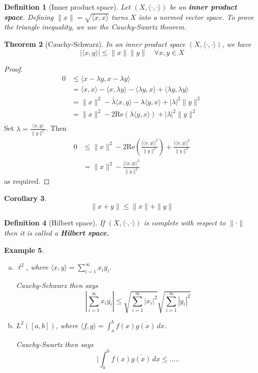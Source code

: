 \documentclass[12pt, oneside, a4paper]{article}
\newtheorem{thm}{Theorem}[section]
\newtheorem{cor}[thm]{Corollary}
\theoremstyle{dfn}
\newtheorem{dfn}[thm]{Definition}
\newtheorem{ex}[thm]{Example}
\renewcommand{\Re}{\text{Re}}
\begin{document}
\begin{dfn}[Inner product space]
    Let $(X, \langle \cdot, \cdot \rangle)$ be an \textbf{inner product space}.  Defining $\| x \| = \sqrt{ \langle x, x \rangle}$ turns $X$ into a normed vector space.  To prove the triangle inequality, we use the Cauchy-Swartz theorem.
\end{dfn}

\begin{thm}[Cauchy-Schwarz]
    In an inner product space $(X, \langle \cdot, \cdot \rangle)$, we have \[
        | \langle x, y \rangle | \leq \|x \| \| y \| \quad \forall x, y  \in X
    \] 
\end{thm}
\begin{proof}
    \begin{align*}
        0   &\leq \langle x - \lambda y, x - \lambda y \rangle \\
            &= \langle x, x \rangle - \langle x, \lambda y \rangle - \langle \lambda y, x \rangle +\langle \lambda y, \lambda y \rangle  \\
            &= \| x \|^2 - \bar \lambda \langle x, y \rangle - \lambda \langle y, x \rangle + |\lambda|^2 \| y \|^2 \\
            &= \| x \|^2 - 2 \Re ( \lambda \langle y, x \rangle ) + |\lambda|^2 \| y \|^2 \\
    \end{align*}  Set $\lambda = \frac{\langle x, y \rangle}{\| y \|^2}$.  Then
    \begin{align*}
        0 &\leq \| x \|^2 - 2 \Re ( \frac{|\langle x, y \rangle|^2}{\| y \|^2} ) + \frac{|\langle x, y \rangle|^2}{\| y \|^2} \\
            &= \| x \|^2 - \frac{|\langle x, y \rangle|^2}{\| y \|^2}
    \end{align*} as required.
\end{proof}

\begin{cor}
    \[
        \| x + y \| \leq \| x \| + \| y \|
    \]
\end{cor}

\begin{dfn}[Hilbert space]
    If $(X, \langle \cdot, \cdot \rangle)$ is complete with respect to $\| \cdot \|$ then it is called a \textbf{Hilbert space.} 
\end{dfn}

\begin{ex}
    \begin{enumerate}[(a)]
        \item $\ell^2$, where $\langle x, y \rangle = \sum_{i=1}^\infty x_i \overline{y_i}$.  
        
        Cauchy-Schwarz then says \[
            | \sum_{i=1}^\infty x_i \overline{y_i} | \leq \sqrt{ \sum_{i=1}^\infty |x_i|^2} \sqrt{\sum_{i=1}^\infty |y_i|^2}
        \]
        \item $L^2([a,b])$, where $\langle f, g \rangle = \int_a^b f(x) \overline{g(x)} \, dx$. 
        
        Cauchy-Swartz then says \[
            | \int_a^b f(x) \overline{ g(x)} \, dx \leq .....
        \]
    \end{enumerate}
\end{ex}
\end{document}
